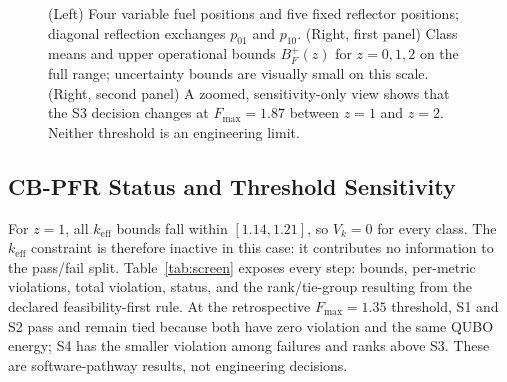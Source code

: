 \documentclass[conference]{IEEEtran}
\begin{document}
\begin{figure}[t]
\begin{minipage}[t]{0.58\textwidth}
\begin{minipage}[t]{0.48\linewidth}
\end{minipage}\hfill
\begin{minipage}[t]{0.48\linewidth}
\centering
{}
\end{minipage}
\end{minipage}
\caption{(Left) Four variable fuel positions and five fixed reflector positions; diagonal reflection exchanges \(p_{01}\) and \(p_{10}\). (Right, first panel) Class means and upper operational bounds \(B_F^+(z)\) for \(z=0,1,2\) on the full range; uncertainty bounds are visually small on this scale. (Right, second panel) A zoomed, sensitivity-only view shows that the S3 decision changes at \(F_{\max}=1.87\) between \(z=1\) and \(z=2\). Neither threshold is an engineering limit.}
\label{fig:map_f}
\end{figure}



\subsection{CB-PFR Status and Threshold Sensitivity}
For $z=1$, all $k_{\mathrm{eff}}$ bounds fall within $[1.14,1.21]$, so $V_k=0$ for every class. The $k_{\mathrm{eff}}$ constraint is therefore inactive in this case: it contributes no information to the pass/fail split. Table~\ref{tab:screen} exposes every step: bounds, per-metric violations, total violation, status, and the rank/tie-group resulting from the declared feasibility-first rule. At the retrospective $F_{\max}=1.35$ threshold, S1 and S2 pass and remain tied because both have zero violation and the same QUBO energy; S4 has the smaller violation among failures and ranks above S3. These are software-pathway results, not engineering decisions.
\end{document}

